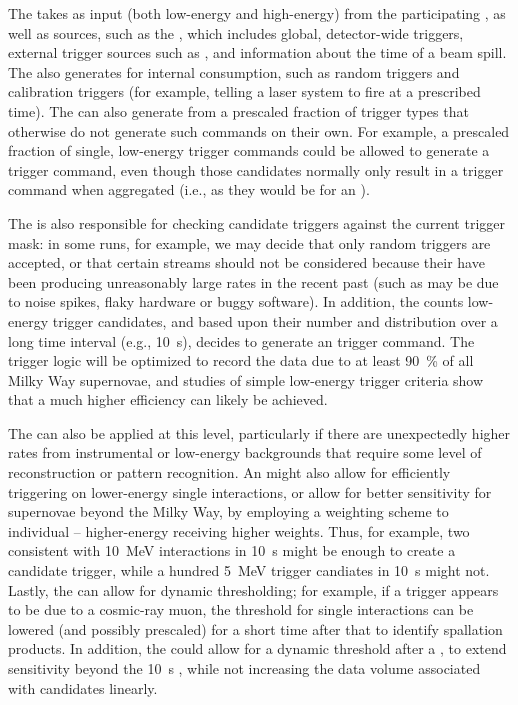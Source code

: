 The  takes as input  (both low-energy
and high-energy) from the participating , as well as
 sources, such as the , which includes
global, detector-wide triggers, external trigger sources such as
, and information about the time of a \fnal beam
spill. 
The   also generates  for internal
consumption, such as random triggers and calibration triggers (for
example, telling a laser system to fire at a prescribed time). 
The  can also generate  from a
prescaled fraction of trigger types that otherwise do not generate
such commands on their own. 
For example, a prescaled fraction of single, low-energy trigger
commands could be allowed to generate a trigger command, even though
those candidates normally only result in a trigger command when
aggregated (i.e., as they would be for an ).


The  is also responsible for checking candidate triggers
against the current  trigger mask: in some runs, for
example, we may decide that only random triggers are accepted, or that
certain  streams should not be considered
because their  have been producing unreasonably large
rates in the recent past (such as may be due to noise spikes, flaky
hardware or buggy software).
In addition, the  counts low-energy trigger candidates,
and based upon their number and distribution over a long time interval
(e.g., \SI{10}{\s}), decides to generate an  trigger command.
The trigger logic will be optimized to record the data due to at least
\SI{90}{\%} of all Milky Way supernovae, and studies of simple low-energy
trigger criteria show that a much higher efficiency can likely be
achieved.

	
The  can also be applied at this level, particularly if
there are unexpectedly higher rates from instrumental or low-energy
backgrounds that require some level of reconstruction or pattern
recognition. 
An  might also allow for efficiently triggering on
lower-energy single interactions, or allow for better sensitivity for
supernovae beyond the Milky Way, by employing a weighting scheme to
individual  -- higher-energy
 receiving higher weights. 
Thus, for example, two  consistent with
\SI{10}{\MeV} interactions in \SI{10}{\s} might be enough to create a
 candidate trigger, while a hundred \SI{5}{\MeV} trigger
candiates in \SI{10}{\s} might not.
Lastly, the  can allow for dynamic thresholding; for
example, if a trigger appears to be due to a cosmic-ray muon, the
threshold for single interactions can be lowered (and possibly
prescaled) for a short time after that to identify spallation
products. 
In addition, the  could allow for a dynamic threshold after
a , to extend sensitivity beyond the \SI{10}{\s}
 , while not increasing the data
volume associated with  candidates linearly. 

